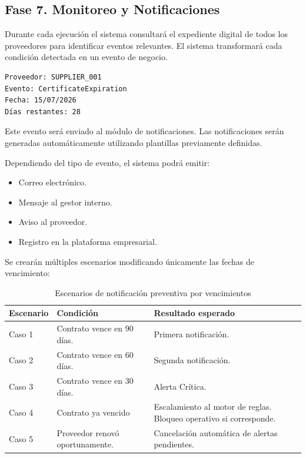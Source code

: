\documentclass[12pt]{article}
\begin{document}
\subsection{Fase 7. Monitoreo y Notificaciones}

Durante cada ejecución el sistema consultará el expediente digital de todos los proveedores para identificar eventos relevantes. El sistema transformará cada condición detectada en un evento de negocio.

\begin{verbatim}
Proveedor: SUPPLIER_001
Evento: CertificateExpiration
Fecha: 15/07/2026
Días restantes: 28
\end{verbatim}

Este evento será enviado al módulo de notificaciones. Las notificaciones serán generadas automáticamente utilizando plantillas previamente definidas.

Dependiendo del tipo de evento, el sistema podrá emitir:

\begin{itemize}
    \item Correo electrónico.
    \item Mensaje al gestor interno.
    \item Aviso al proveedor.
    \item Registro en la plataforma empresarial.
\end{itemize}

Se crearán múltiples escenarios modificando únicamente las fechas de vencimiento:

\begin{table}[htbp]
\centering
\caption{Escenarios de notificación preventiva por vencimientos}
\vspace{0.3cm}
\label{tab:escenarios-notificaciones}
\renewcommand{\arraystretch}{1.2}
\begin{tabularx}{\textwidth}{|p{2.6cm}|>{\raggedright\arraybackslash}X|>{\raggedright\arraybackslash}X|}
\hline
\textbf{Escenario} & \textbf{Condición} & \textbf{Resultado esperado} \\
\hline
Caso 1 & Contrato vence en 90 días. & Primera notificación. \\
\hline
Caso 2 & Contrato vence en 60 días. & Segunda notificación. \\
\hline
Caso 3 & Contrato vence en 30 días. & Alerta Crítica. \\
\hline
Caso 4 & Contrato ya vencido & Escalamiento al motor de reglas. \newline Bloqueo operativo si corresponde. \\
\hline
Caso 5 & Proveedor renovó oportunamente. & Cancelación automática de alertas pendientes. \\
\hline
\end{tabularx}
\end{table}
\end{document}

